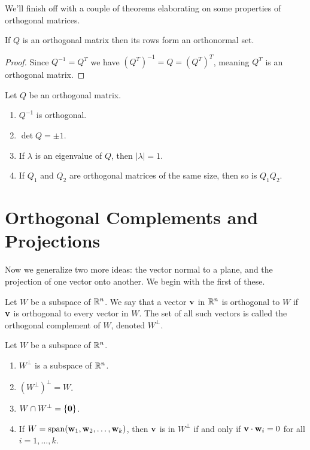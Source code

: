 \documentclass[../m073main.tex]{subfiles}
\begin{document}
We'll finish off with a couple of theorems elaborating on some properties of orthogonal matrices.

\begin{theorem}
	If $Q$ is an orthogonal matrix then its rows form an orthonormal set.
\end{theorem}

\begin{proof}
	Since $Q^{-1} = Q^T$ we have $(Q^T)^{-1} = Q = (Q^T)^T$, meaning $Q^T$ is an orthogonal matrix.
\end{proof}

\begin{theorem}
	Let $Q$ be an orthogonal matrix.
	\begin{enumerate}[label=(\alph*)]
		\item $Q^{-1}$ is orthogonal.
		\item $\det Q = \pm 1$.
		\item If $\lambda$ is an eigenvalue of $Q$, then $|\lambda| = 1$.
		\item If $Q_1$ and $Q_2$ are orthogonal matrices of the same size, then so is $Q_1 Q_2$.
	\end{enumerate}
\end{theorem}

\section{Orthogonal Complements and Projections}
Now we generalize two more ideas: the vector normal to a plane, and the projection of one vector onto another.           
We begin with the first of these.

\begin{definition}
	Let $W$ be a subspace of $\mathbb{R}^n$.
	We say that a vector $\mathbf{v}$ in $\mathbb{R}^n$ is orthogonal to $W$ if $\mathbf{v}$ is orthogonal to every vector in $W$.
	The set of all such vectors is called the orthogonal complement of $W$, denoted $W^\perp$.
\end{definition}

\begin{theorem}
	Let $W$ be a subspace of $\mathbb{R}^n$.
	\begin{multicols}{2}
		\begin{enumerate}[label=(\alph*)]
			\item $W^\perp$ is a subspace of $\mathbb{R}^n$.
			\item $\left( W^\perp \right)^\perp = W$.
			\item $W \cap W^\perp = \{\mathbf{0}\}$.
			\item If $W = \textrm{span}(\mathbf{w}_1, \mathbf{w}_2, \ldots, \mathbf{w}_k)$, then $\mathbf{v}$ is in $W^\perp$ if and only if $\mathbf{v} \cdot \mathbf{w}_i = 0$ for all $i = 1, \ldots, k$.
		\end{enumerate}
	\end{multicols}
\end{theorem}
\end{document}
